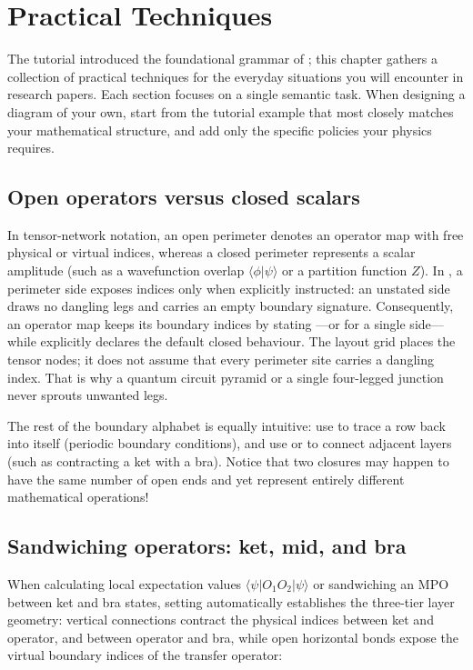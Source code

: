 \section{Practical Techniques}\label{ch:recipes}

The tutorial introduced the foundational grammar of \pkg{}; this chapter gathers
a collection of practical techniques for the everyday situations you will encounter
in research papers.  Each section focuses on a single semantic task.  When
designing a diagram of your own, start from the tutorial example that most
closely matches your mathematical structure, and add only the specific policies
your physics requires.

\subsection{Open operators versus closed scalars}

In tensor-network notation, an open perimeter denotes an operator map with free
physical or virtual indices, whereas a closed perimeter represents a scalar
amplitude (such as a wavefunction overlap $\langle\phi|\psi\rangle$ or a
partition function $Z$).  In \pkg{}, a perimeter side exposes indices only when
explicitly instructed: an unstated side draws no dangling legs and carries an
empty boundary signature.  Consequently, an operator map keeps its boundary
indices by stating ---or  for a single
side---while  explicitly declares the default closed
behaviour.  The layout grid places the tensor nodes; it does not assume that
every perimeter site carries a dangling index.  That is why a quantum circuit
pyramid or a single four-legged junction never sprouts unwanted legs.

The rest of the boundary alphabet is equally intuitive: use
 to trace a row back into itself (periodic boundary
conditions), and use  or  to connect adjacent
layers (such as contracting a ket with a bra).  Notice that two closures may
happen to have the same number of open ends and yet represent entirely
different mathematical operations!

\subsection{Sandwiching operators: ket, mid, and bra}

When calculating local expectation values $\langle\psi|O_1O_2|\psi\rangle$ or
sandwiching an MPO between ket and bra states, setting
 automatically establishes the three-tier
layer geometry: vertical connections contract the physical indices between ket
and operator, and between operator and bra, while open horizontal bonds expose
the virtual boundary indices of the transfer operator:

